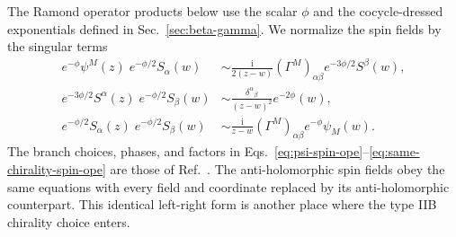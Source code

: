 \documentclass[12pt]{article}
\numberwithin{equation}{section}
\renewcommand{\i}{\mathrm{i}}
\begin{document}
The Ramond operator products below use the scalar $\phi$ and the
cocycle-dressed exponentials defined in Sec.~\ref{sec:beta-gamma}.  We
normalize the spin fields by the singular terms
\begin{align}
e^{-\phi}\psi^M(z)\;e^{-\phi/2}S_\alpha(w)
&\sim
\frac{\i}{2(z-w)}
(\Gamma^M)_{\alpha\beta}
e^{-3\phi/2}S^\beta(w),
\label{eq:psi-spin-ope}
\\
e^{-3\phi/2}S^\alpha(z)\;e^{-\phi/2}S_\beta(w)
&\sim
\frac{\delta^\alpha{}_\beta}{(z-w)^2}e^{-2\phi}(w),
\label{eq:spin-conjugate-ope}
\\
e^{-\phi/2}S_\alpha(z)\;e^{-\phi/2}S_\beta(w)
&\sim
\frac{\i}{z-w}(\Gamma^M)_{\alpha\beta}
e^{-\phi}\psi_M(w).
\label{eq:same-chirality-spin-ope}
\end{align}
The branch choices, phases, and factors in
Eqs.~\eqref{eq:psi-spin-ope}--\eqref{eq:same-chirality-spin-ope} are those of
Ref.~\cite{Alexandrov:2021dyl}.  The anti-holomorphic spin fields obey the
same equations with every field and coordinate replaced by its
anti-holomorphic counterpart.  This identical left-right form is another
place where the type IIB chirality choice enters.
\begingroup
\small


\endgroup
\end{document}
